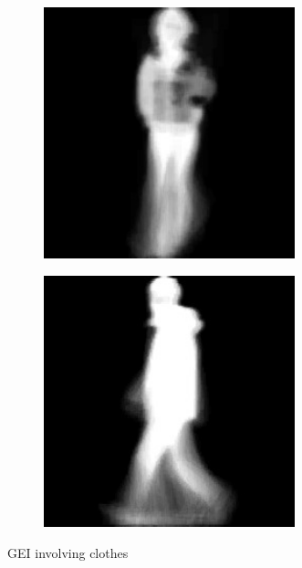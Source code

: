 \documentclass[12pt,a4paper]{article}
\begin{document}
\begin{figure}[!h]
    \centering
    \begin{subfigure}{0.45\textwidth}
        \centering
        \includegraphics[width=0.8\textwidth]{walk-cl1.jpg}
        
        \label{fig:img1}
    \end{subfigure}
    \begin{subfigure}{0.45\textwidth}
        \centering
        \includegraphics[width=0.8\textwidth]{walk-cl2.jpg}
        
        \label{fig:img2}
    \end{subfigure}
    \caption{GEI involving clothes}
\end{figure}
    
\end{document}
